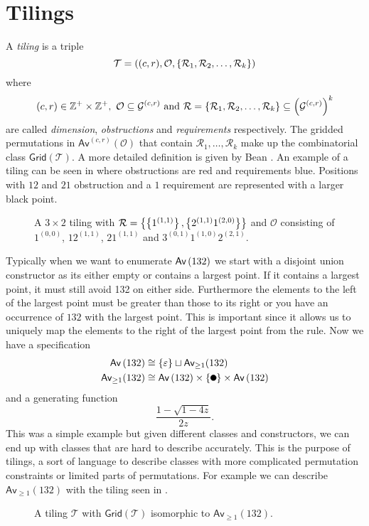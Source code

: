 \section{Tilings\label{sec:tilings}}
A \emph{tiling} is a triple
\[
\mathcal{T} = ((c,r), \mathcal{O}, \left\{\mathcal{R}_1,\mathcal{R}_2,\dotsc,\mathcal{R}_k\right\})
\]
where
\[
    (c,r) \in \mathbb{Z}^+ \times \mathbb{Z}^+, \ \mathcal{O} \subseteq \mathcal{G}^{(c,r)} \text{ and } \mathcal{R}=\left\{\mathcal{R}_1,\mathcal{R}_2,\dotsc,\mathcal{R}_k\right\} \subseteq \left(\mathcal{G}^{(c,r)}\right)^k
\]
are called \emph{dimension}, \emph{obstructions} and \emph{requirements} respectively. The gridded permutations in $\textsf{Av}^{(c,r)}\left(\mathcal{O}\right)$ that contain $\mathcal{R}_1,\dotsc,\mathcal{R}_k$ make up the combinatorial class $\textsf{Grid}(\mathcal{T})$. A more detailed definition is given by Bean \cite{BeanPhd:phd}. An example of a tiling can be seen in  where obstructions are red and requirements blue. Positions with $12$ and $21$ obstruction and a $1$ requirement are represented with a larger black point. 

\begin{figure}[ht!]
    \centering
    
    \caption{A $3 \times 2$ tiling with $\mathcal{R} = \left\{\left\{1^{(1,1)}\right\}, \left\{2^{(1,1)}1^{(2,0)}\right\}\right\}$ and $\mathcal{O}$ consisting of $1^{(0,0)}$, $12^{(1,1)}$, $21^{(1,1)}$ and $3^{(0,1)}1^{(1,0)}2^{(2,1)}$.}
    \label{fig:tiling_example}
\end{figure}

Typically when we want to enumerate $\textsf{Av}\left(132\right)$ we start with a disjoint union constructor as its either empty or contains a largest point. If it contains a largest point, it must still avoid 132 on either side. Furthermore the elements to the left of the largest point must be greater than those to its right or you have an occurrence of $132$ with the largest point. This is important since it allows us to uniquely map the elements to the right of the largest point from the rule. Now we have a specification
\begin{align*}
\Av{132} &\cong \set{\varepsilon} \sqcup \textsf{Av}_{\geq1}(132)\\
\textsf{Av}_{\geq1}(132) &\cong \Av{132} \times \set{\point{0.1}} \times \Av{132}
\end{align*}
and a generating function
\[
\frac{1-\sqrt{1-4z}}{2z}.
\]
This was a simple example but given different classes and constructors, we can end up with classes that are hard to describe accurately. This is the purpose of tilings, a sort of language to describe classes with more complicated permutation constraints or limited parts of permutations. For example we can describe $\textsf{Av}_{\geq1}(132)$ with the tiling seen in .

\begin{figure}[ht!]
    \centering
    
    \caption{A tiling $\mathcal{T}$ with $\textsf{Grid}(\mathcal{T})$ isomorphic to $\textsf{Av}_{\geq1}(132)$.}
    \label{fig:tiling132}
\end{figure}